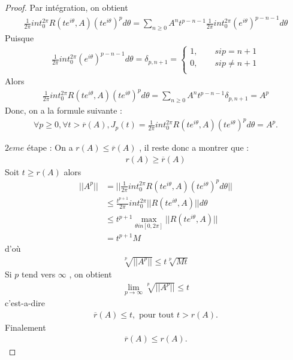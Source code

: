 \documentclass{report}
\begin{document}
{\begin{proof}
	Par intégration, on obtient 
					\begin{align*}
								 \frac{1}{2\pi} int_{0}^{2\pi} R(t e^{i \theta}, A)(t e^{i \theta})^p d\theta = \sum_{n\ge 0} A^n t^{p-n-1} \frac{1}{2\pi} int_{0}^{2\pi} (e^{i \theta})^{p-n-1} d\theta
					\end{align*}
	Puisque 
					\begin{align*}
								 \frac{1}{2\pi} int_{0}^{2\pi} (e^{i \theta})^{p-n-1} d\theta = \delta_{p,n+1} = \begin{cases}
										1, \quad \quad si p = n+1 \\
										0, \quad \quad  si p \neq n+1 \\
							   		  \end{cases} 
					\end{align*}
	Alors 
					\begin{align*}
								 \frac{1}{2\pi} int_{0}^{2\pi} R(t e^{i \theta}, A)(t e^{i \theta})^p d\theta = \sum_{n\ge 0} A^n t^{p-n-1} \delta_{p,n+1} = A^p 
					\end{align*}
	Donc, on a la formule suivante : 
					\begin{align*}
					\forall p \ge 0, \forall t > \overline{r}(A) , J_p(t) = \frac{1}{2\pi} int_{0}^{2\pi} R(t e^{i \theta}, A)(t e^{i \theta})^p d\theta = A^p .
					\end{align*}

$2eme$ étape : On a $r(A) \le \overline{r}(A)$ , il reste donc a montrer que : 
					\begin{align*}
								 r(A) \ge \overline{r}(A) 
					\end{align*}
	Soit $t \ge r(A)$ alors 
					\begin{align*}
								 ||A^p|| &= ||\frac{1}{2\pi} int_{0}^{2\pi} R(t e^{i \theta}, A) (t e^{i \theta})^p d\theta|| \\
								 &\le \frac{t^{p+1}}{2\pi} int_{0}^{2\pi} ||R(t e^{i \theta}, A)|| d\theta \\
								 &\le t^{p+1} \max_{\theta in [0,2\pi]} ||R(t e^{i \theta}, A)|| \\
								 &= t^{p+1} M 
					\end{align*}
	d'où 
					\begin{align*}
								 \sqrt[p]{||A^p||} \le t \sqrt[p]{M t}
					\end{align*}
	Si $p$ tend vers $\infty$ , on obtient 
					\begin{align*}
								 \lim_{p\to \infty} \sqrt[p]{||A^p||} \le t 
					\end{align*}
	c'est-a-dire 
					\begin{align*}
								 \overline{r}(A) \le t , \,\,\text{pour tout}\,\, t > r(A) .
					\end{align*}
	Finalement 
					\begin{align*}
								 \overline{r}(A) \le r(A) . 
					\end{align*}
\end{proof}



}
\end{document}
